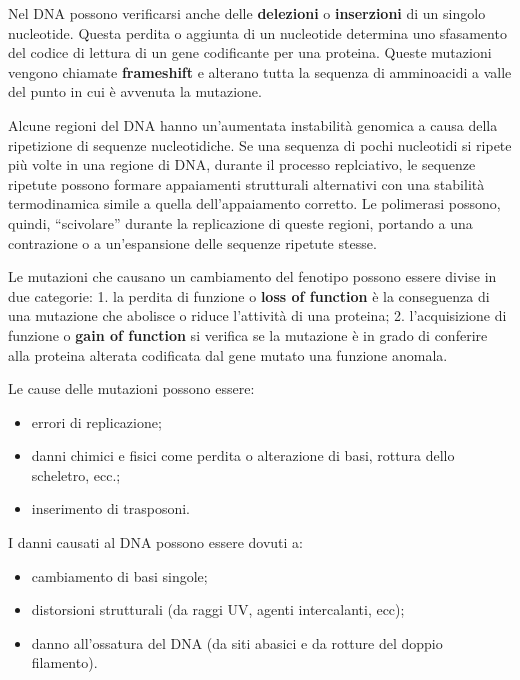 \documentclass[11pt]{book}
\begin{document}
Nel DNA possono verificarsi anche delle \textbf{delezioni} o
\textbf{inserzioni} di un singolo nucleotide. Questa perdita o aggiunta
di un nucleotide determina uno sfasamento del codice di lettura di un
gene codificante per una proteina. Queste mutazioni vengono chiamate
\textbf{frameshift} e alterano tutta la sequenza di amminoacidi a valle
del punto in cui è avvenuta la mutazione.

Alcune regioni del DNA hanno un'aumentata instabilità genomica a causa
della ripetizione di sequenze nucleotidiche. Se una sequenza di pochi
nucleotidi si ripete più volte in una regione di DNA, durante il
processo replciativo, le sequenze ripetute possono formare appaiamenti
strutturali alternativi con una stabilità termodinamica simile a quella
dell'appaiamento corretto. Le polimerasi possono, quindi, ``scivolare''
durante la replicazione di queste regioni, portando a una contrazione o
a un'espansione delle sequenze ripetute stesse.

Le mutazioni che causano un cambiamento del fenotipo possono essere
divise in due categorie: 1. la perdita di funzione o \textbf{loss of
function} è la conseguenza di una mutazione che abolisce o riduce
l'attività di una proteina; 2. l'acquisizione di funzione o \textbf{gain
of function} si verifica se la mutazione è in grado di conferire alla
proteina alterata codificata dal gene mutato una funzione anomala.

Le cause delle mutazioni possono essere:

\begin{itemize}
\itemsep1pt\parskip0pt
\item
  errori di replicazione;
\item
  danni chimici e fisici come perdita o alterazione di basi, rottura
  dello scheletro, ecc.;
\item
  inserimento di trasposoni.
\end{itemize}

I danni causati al DNA possono essere dovuti a:

\begin{itemize}
\itemsep1pt\parskip0pt
\item
  cambiamento di basi singole;
\item
  distorsioni strutturali (da raggi UV, agenti intercalanti, ecc);
\item
  danno all'ossatura del DNA (da siti abasici e da rotture del doppio
  filamento).
\end{itemize}
\end{document}
